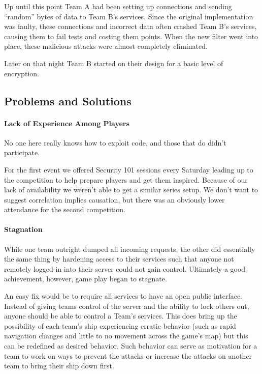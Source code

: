 \documentclass[10pt]{article}
\begin{document}
Up until this point Team A had been setting up connections and sending ``random''
bytes of data to Team B's services. Since the original implementation was
faulty, these connections and incorrect data often crashed Team B's services,
causing them to fail tests and costing them points. When the new filter went
into place, these malicious attacks were almost completely eliminated.

Later on that night Team B started on their design for a basic level of
encryption. 

\subsection{Problems and Solutions}
\paragraph*{Lack of Experience Among Players} No one here really knows how to
exploit code, and those that do didn't participate.

For the first event we offered Security 101 sessions every Saturday leading up
to the competition to help prepare players and get them inspired. Because of
our lack of availability we weren't able to get a similar series setup. We
don't want to suggest correlation implies causation, but there was an obviously
lower attendance for the second competition.

\paragraph*{Stagnation} While one team outright dumped all incoming requests, 
the other did essentially the same thing by hardening access to their services
such that anyone not remotely logged-in into their server could not gain
control. Ultimately a good achievement, however, game play began to stagnate.

An easy fix would be to require all services to have an open public interface.
Instead of giving teams control of the server and the ability to lock others
out, anyone should be able to control a Team's services. This does bring up the
possibility of each team's ship experiencing erratic behavior (such as rapid
navigation changes and little to no movement across the game's map) but this
can be redefined as desired behavior. Such behavior can serve as motivation for
a team to work on ways to prevent the attacks or increase the attacks on
another team to bring their ship down first.
\end{document}
